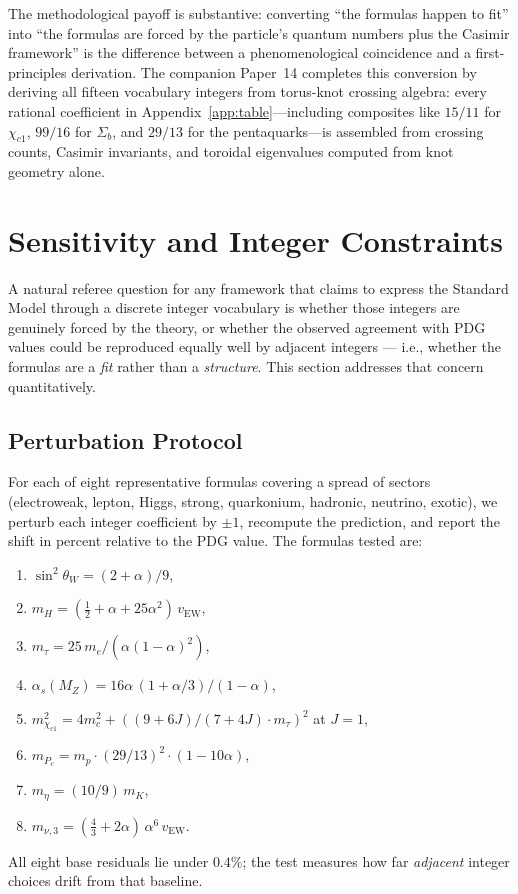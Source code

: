 \documentclass[11pt]{article}
\begin{document}
The methodological payoff is substantive: converting ``the
formulas happen to fit'' into ``the formulas are forced by the
particle's quantum numbers plus the Casimir framework'' is the
difference between a phenomenological coincidence and a
first-principles derivation.  The companion Paper~14 completes
this conversion by deriving all fifteen vocabulary integers from
torus-knot crossing algebra: every rational coefficient in
Appendix~\ref{app:table}---including composites like $15/11$ for
$\chi_{c1}$, $99/16$ for $\Sigma_b$, and $29/13$ for the
pentaquarks---is assembled from crossing counts, Casimir
invariants, and toroidal eigenvalues computed from knot geometry
alone.

\section{Sensitivity and Integer Constraints}
\label{sec:sensitivity}

A natural referee question for any framework that claims to express
the Standard Model through a discrete integer vocabulary is whether
those integers are genuinely forced by the theory, or whether the
observed agreement with PDG values could be reproduced equally well
by adjacent integers --- i.e., whether the formulas are a
\emph{fit} rather than a \emph{structure}.  This section addresses
that concern quantitatively.

\subsection{Perturbation Protocol}

For each of eight representative formulas covering a spread of
sectors (electroweak, lepton, Higgs, strong, quarkonium, hadronic,
neutrino, exotic), we perturb each integer coefficient by $\pm 1$,
recompute the prediction, and report the shift in percent relative
to the PDG value.  The formulas tested are:
\begin{enumerate}
  \item $\sin^2\theta_W = (2+\alpha)/9$,
  \item $m_H = (\tfrac{1}{2} + \alpha + 25\alpha^2)\,v_\text{EW}$,
  \item $m_\tau = 25\,m_e / (\alpha(1-\alpha)^2)$,
  \item $\alpha_s(M_Z) = 16\alpha\,(1+\alpha/3)/(1-\alpha)$,
  \item $m^2_{\chi_{c1}} = 4m_c^2 + ((9{+}6J)/(7{+}4J) \cdot m_\tau)^2$ at $J=1$,
  \item $m_{P_c} = m_p \cdot (29/13)^2 \cdot (1-10\alpha)$,
  \item $m_\eta = (10/9)\,m_K$,
  \item $m_{\nu,3} = (\tfrac{4}{3} + 2\alpha)\,\alpha^6\,v_\text{EW}$.
\end{enumerate}
All eight base residuals lie under $0.4\%$; the test measures how
far \emph{adjacent} integer choices drift from that baseline.
\end{document}
